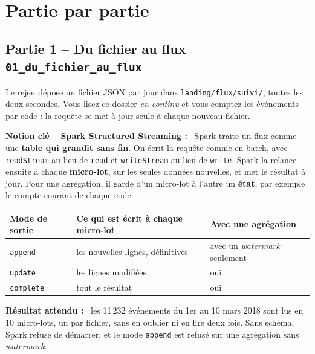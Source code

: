 \documentclass[11pt,a4paper]{article}
\newenvironment{resultat}{\par\medskip\noindent\textbf{Résultat attendu :}\ }{\par\medskip}
\newcommand{\cmd}[1]{\texttt{#1}}
\newenvironment{notion}[1][]{\par\medskip\noindent\textbf{\textcolor{lhblue}{Notion clé\if\relax\detokenize{#1}\relax\else{} -- #1\fi{} :}}\ }{\par\medskip}
\newcommand{\nb}[1]{\textcolor{lhblue}{\texttt{#1}}}
\begin{document}
\section{Partie par partie}

\subsection*{Partie 1 -- Du fichier au flux \hfill \nb{01\_du\_fichier\_au\_flux}}

Le rejeu dépose un fichier JSON par jour dans \cmd{landing/flux/suivi/}, toutes les deux secondes.
Vous lisez ce dossier \emph{en continu} et vous comptez les événements par code : la requête se met
à jour seule à chaque nouveau fichier.

\begin{notion}[Spark Structured Streaming]
Spark traite un flux comme une \textbf{table qui grandit sans
fin}. On écrit la requête comme en batch, avec \cmd{readStream} au lieu de \cmd{read} et
\cmd{writeStream} au lieu de \cmd{write}. Spark la relance ensuite à chaque \textbf{micro-lot}, sur
les seules données nouvelles, et met le résultat à jour. Pour une agrégation, il garde d'un
micro-lot à l'autre un \textbf{état}, par exemple le compte courant de chaque code.
\end{notion}

\begin{center}
\small
\renewcommand{\arraystretch}{1.25}
\begin{tabularx}{\textwidth}{@{}l X l@{}}
\toprule
\textbf{Mode de sortie} & \textbf{Ce qui est écrit à chaque micro-lot} & \textbf{Avec une agrégation} \\
\midrule
\cmd{append}   & les nouvelles lignes, définitives & avec un \emph{watermark} seulement \\
\cmd{update}   & les lignes modifiées & oui \\
\cmd{complete} & tout le résultat & oui \\
\bottomrule
\end{tabularx}
\end{center}

\begin{resultat}
les 11\,232 événements du 1er au 10 mars 2018 sont lus en 10 micro-lots, un par fichier, sans en
oublier ni en lire deux fois. Sans schéma, Spark refuse de démarrer, et le mode \cmd{append} est
refusé sur une agrégation sans \emph{watermark}.
\end{resultat}
\end{document}
